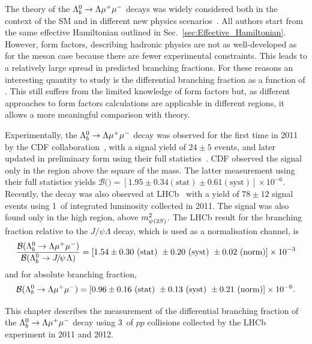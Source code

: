 The theory of the ${{\Lambda}^0_{b}}\rightarrow{\ensuremath{\Lambda}}{\ensuremath{\mu^+\mu^-}}$ decays was widely considered both in the context of the SM and in different
new physics scenarios~\cite{Aslam:2008hp,Wang:2008sm,Huang:1998ek,Chen:2001ki,Chen:2001zc,Chen:2001sj,
Zolfagharpour:2007eh,Mott:2011cx,Aliev:2010uy,Mohanta:2010eb,Sahoo:2011yb}.
All authors start from the same effective Hamiltonian outlined in Sec.~\ref{sec:Effective_Hamiltonian}. 
However, form factors, describing hadronic physics are not as well-developed as for the meson case 
because there are fewer experimental constraints. This leads to a relatively
large spread in predicted branching fractions. For these reasons an interesting quantity to study is the differential 
branching fraction as a function of \qsq. This still suffers from the limited knowledge of form factors but, as different 
approaches to form factors calculations are applicable in different \qsq regions, it allows a more meaningful comparison with theory.

Experimentally, the ${{\Lambda}^0_{b}}\rightarrow{\ensuremath{\Lambda}}{\ensuremath{\mu^+\mu^-}}$ decay was observed for the first time in 2011 by the CDF 
collaboration~\cite{Aaltonen:2011qs}, with a signal yield of $24\pm5$ events, and later updated in preliminary form using
their full statistics~\cite{Behari:2013xc}. CDF observed the signal only in the \qsq region above the square of the \psitwos mass.
The latter measurement using their full statistics yields $\mathcal{B}($\Lb\to\Lz\mumu$) =[1.95\pm0.34(\mathrm{stat})\pm0.61(\mathrm{syst})]\times 10^{-6}$.
Recently, the decay was also observed at LHCb~\cite{LHCb-PAPER-2013-025} with a yield of $78\pm12$ signal events
using 1~\invfb of integrated luminosity collected in 2011. The signal was also found only in the high \qsq region, above $m^2_{\psitwos}$.
The LHCb result for the branching fraction relative to the $J/\psi\Lambda$ decay, which is used as a normalisation channel, is 
%
\begin{equation*}
\frac{\mathcal{B}(\Lb\to\Lz\mumu)}{\mathcal{B}(\Lb\to\jpsi\Lz)}=[1.54 \pm 0.30 ~(\mathrm{stat})~ \pm 0.20 ~(\mathrm{syst})~ \pm 0.02 ~(\mathrm{norm})]\times 10^{-3} 
\end{equation*}
and for absolute branching fraction,
\begin{equation*}
\mathcal{B}({{\Lambda}^0_{b}}\rightarrow{\ensuremath{\Lambda}}{\ensuremath{\mu^+\mu^-}}) =[0.96 \pm 0.16 ~(\mathrm{stat})~ \pm 0.13 ~(\mathrm{syst})~ \pm 0.21 ~(\mathrm{norm})]\times 10^{-6}.
\end{equation*}

This chapter describes the measurement of the differential branching fraction
of the ${{\Lambda}^0_{b}}\rightarrow{\ensuremath{\Lambda}}{\ensuremath{\mu^+\mu^-}}$ decay using 3~\invfb of $pp$ collisions collected by the LHCb experiment in 2011 and 2012.

